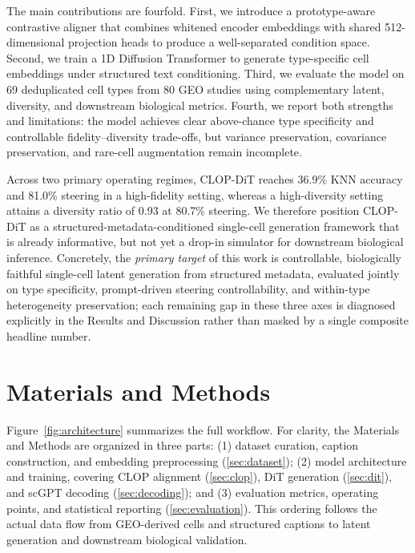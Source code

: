 \documentclass[11pt,a4paper]{article}
\begin{document}
The main contributions are fourfold. First, we introduce a prototype-aware contrastive aligner that combines whitened encoder embeddings with shared 512-dimensional projection heads to produce a well-separated condition space. Second, we train a 1D Diffusion Transformer to generate type-specific cell embeddings under structured text conditioning. Third, we evaluate the model on 69 deduplicated cell types from 80 GEO studies using complementary latent, diversity, and downstream biological metrics. Fourth, we report both strengths and limitations: the model achieves clear above-chance type specificity and controllable fidelity--diversity trade-offs, but variance preservation, covariance preservation, and rare-cell augmentation remain incomplete.

Across two primary operating regimes, CLOP-DiT reaches 36.9\% KNN accuracy and 81.0\% steering in a high-fidelity setting, whereas a high-diversity setting attains a diversity ratio of 0.93 at 80.7\% steering. We therefore position CLOP-DiT as a structured-metadata-conditioned single-cell generation framework that is already informative, but not yet a drop-in simulator for downstream biological inference. Concretely, the \emph{primary target} of this work is controllable, biologically faithful single-cell latent generation from structured metadata, evaluated jointly on type specificity, prompt-driven steering controllability, and within-type heterogeneity preservation; each remaining gap in these three axes is diagnosed explicitly in the Results and Discussion rather than masked by a single composite headline number.

\section{Materials and Methods}

Figure~\ref{fig:architecture} summarizes the full workflow. For clarity, the Materials and Methods are organized in three parts: (1) dataset curation, caption construction, and embedding preprocessing (\ref{sec:dataset}); (2) model architecture and training, covering CLOP alignment (\ref{sec:clop}), DiT generation (\ref{sec:dit}), and scGPT decoding (\ref{sec:decoding}); and (3) evaluation metrics, operating points, and statistical reporting (\ref{sec:evaluation}). This ordering follows the actual data flow from GEO-derived cells and structured captions to latent generation and downstream biological validation.
\end{document}
